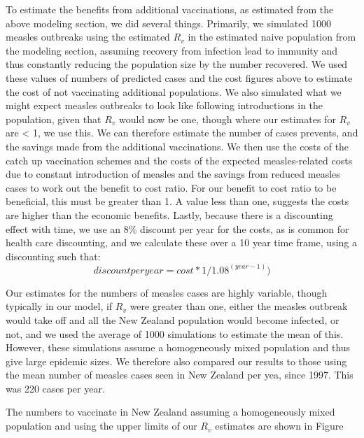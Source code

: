 \documentclass{article}
\begin{document}
To estimate the benefits from additional vaccinations, as estimated from the above modeling section, we did several things. Primarily, we simulated 1000 measles outbreaks using the estimated $R_v$ in the estimated naive population from the modeling section, assuming recovery from infection lead to immunity and thus constantly reducing the population size by the number recovered. We used these values of numbers of predicted cases and the cost figures above to estimate the cost of not vaccinating additional populations. We also simulated what we might expect measles outbreaks to look like following introductions in the population, given that $R_v$ would now be one, though where our estimates for $R_v$ are < 1, we use this. We can therefore estimate the number of cases prevents, and the savings made from the additional vaccinations. We then use the costs of the catch up vaccination schemes and the costs of the expected measles-related costs due to constant introduction of measles and the savings from reduced measles cases to work out the benefit to cost ratio. For our benefit to cost ratio to be beneficial, this must be greater than 1. A value less than one, suggests the costs are higher than the economic benefits. Lastly, because there is a discounting effect with time, we use an 8\% discount per year for the costs, as is common for health care discounting, and we calculate these over a 10 year time frame, using a discounting such that:
\begin{equation} \label{eq:reg}
discount per year = cost * 1/1.08^(year-1))
  \end{equation}

Our estimates for the numbers of measles cases are highly variable, though typically in our model, if $R_v$ were greater than one, either the measles outbreak would take off and all the New Zealand population would become infected, or not, and we used the average of 1000 simulations to estimate the mean of this. However, these simulations assume a homogeneously mixed population and thus give large epidemic sizes. We therefore also compared our results to those using the mean number of measles cases seen in New Zealand per yea, since 1997. This was 220 cases per year.

The numbers to vaccinate in New Zealand assuming a homogeneously mixed population and using the upper limits of our $R_v$ estimates are shown in Figure
\end{document}
